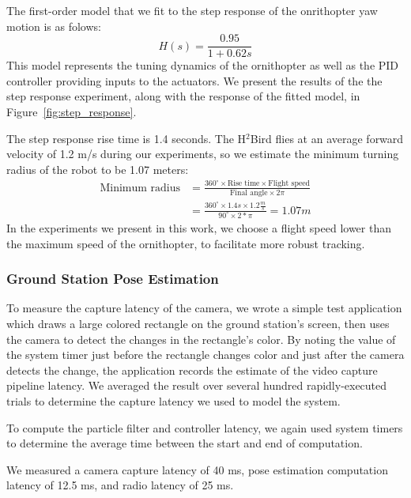 \documentclass{aamas2013}
\begin{document}
The first-order model that we fit to the step response of the onrithopter 
yaw motion is as folows:
\begin{equation}
\label{eq:transfer_func}
H(s) = \frac{0.95}{1+0.62s}
\end{equation}
This model represents the tuning dynamics of the ornithopter as well as the
PID controller providing inputs to the actuators. We present the results of
the the step response experiment, along with the response of the fitted model,
in Figure~\ref{fig:step_response}.

The step response rise time is 1.4 seconds. The H$^2$Bird flies at an 
average forward velocity of 1.2 m/s during our experiments, so we estimate 
the minimum turning radius of the robot to be 1.07 meters:
\begin{equation}
\label{eq:min_radius}
\begin{aligned}
\text{Minimum radius} & = \frac{360^{\circ}\times\text{Rise time}\times\text{Flight
speed}}{\text{Final angle}\times 2\pi}\\
& = \frac{360^{\circ}\times 1.4s\times 1.2\frac{m}{s}}{90^{\circ}\times2*\pi} = 1.07 m
\end{aligned}
\end{equation}
In the experiments we present in this work, we choose a flight speed lower 
than the maximum speed of the ornithopter, to facilitate more robust 
tracking.

\subsubsection{Ground Station Pose Estimation}
To measure the capture latency of the camera, we wrote a simple test
application which draws a large colored rectangle on the ground station's
screen, then uses the camera to detect the changes in the rectangle's color.
By noting the value of the system timer just before the rectangle changes
color and just after the camera detects the change, the application records
the estimate of the video capture pipeline latency. We averaged the result
over several hundred rapidly-executed trials to determine the capture latency
we used to model the system.

To compute the particle filter and controller latency, we again used system 
timers to determine the average time between the start and end of computation.

We measured a camera capture latency of 40 ms, pose estimation computation 
latency of 12.5 ms, and radio latency of 25 ms.
\end{document}
